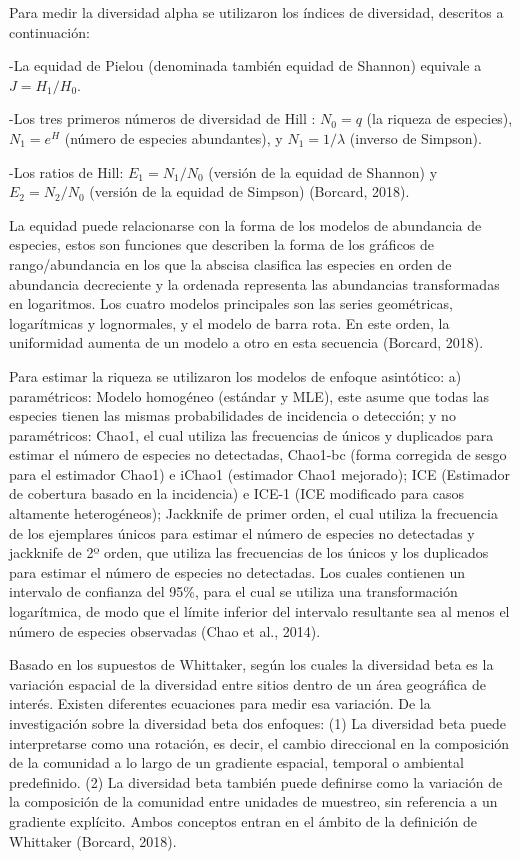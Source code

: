 \documentclass[11pt,]{article}
\begin{document}
Para medir la diversidad alpha se utilizaron los índices de diversidad,
descritos a continuación:

-La equidad de Pielou (denominada también equidad de Shannon) equivale a
\(J=H_1/H_0\).

-Los tres primeros números de diversidad de Hill : \(N_0 =q\) (la
riqueza de especies), \(N_1 = e^H\) (número de especies abundantes), y
\(N_1 = 1/\)\(\lambda\) (inverso de Simpson).

-Los ratios de Hill: \(E_1 = N_1/N_0\) (versión de la equidad de
Shannon) y \(E_2 = N_2/N_0\) (versión de la equidad de Simpson)
(Borcard, 2018).

La equidad puede relacionarse con la forma de los modelos de abundancia
de especies, estos son funciones que describen la forma de los gráficos
de rango/abundancia en los que la abscisa clasifica las especies en
orden de abundancia decreciente y la ordenada representa las abundancias
transformadas en logaritmos. Los cuatro modelos principales son las
series geométricas, logarítmicas y lognormales, y el modelo de barra
rota. En este orden, la uniformidad aumenta de un modelo a otro en esta
secuencia (Borcard, 2018).

Para estimar la riqueza se utilizaron los modelos de enfoque asintótico:
a) paramétricos: Modelo homogéneo (estándar y MLE), este asume que todas
las especies tienen las mismas probabilidades de incidencia o detección;
y no paramétricos: Chao1, el cual utiliza las frecuencias de únicos y
duplicados para estimar el número de especies no detectadas, Chao1-bc
(forma corregida de sesgo para el estimador Chao1) e iChao1 (estimador
Chao1 mejorado); ICE (Estimador de cobertura basado en la incidencia) e
ICE-1 (ICE modificado para casos altamente heterogéneos); Jackknife de
primer orden, el cual utiliza la frecuencia de los ejemplares únicos
para estimar el número de especies no detectadas y jackknife de 2º
orden, que utiliza las frecuencias de los únicos y los duplicados para
estimar el número de especies no detectadas. Los cuales contienen un
intervalo de confianza del 95\%, para el cual se utiliza una
transformación logarítmica, de modo que el límite inferior del intervalo
resultante sea al menos el número de especies observadas (Chao et al.,
2014).

Basado en los supuestos de Whittaker, según los cuales la diversidad
beta es la variación espacial de la diversidad entre sitios dentro de un
área geográfica de interés. Existen diferentes ecuaciones para medir esa
variación. De la investigación sobre la diversidad beta dos enfoques:
(1) La diversidad beta puede interpretarse como una rotación, es decir,
el cambio direccional en la composición de la comunidad a lo largo de un
gradiente espacial, temporal o ambiental predefinido. (2) La diversidad
beta también puede definirse como la variación de la composición de la
comunidad entre unidades de muestreo, sin referencia a un gradiente
explícito. Ambos conceptos entran en el ámbito de la definición de
Whittaker (Borcard, 2018).
\end{document}
